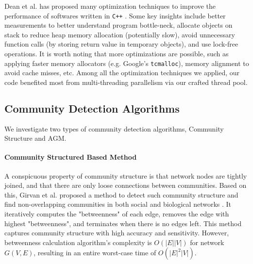 \par Dean et al. has proposed many optimization techniques 
to improve the performance of softwares written in \texttt{C++}
\citep{perfhint}. Some key insights include better measurements
to better understand program bottle-neck, allocate objects
on stack to reduce heap memory allocation (potentially slow), 
avoid unnecessary function calls (by storing return value in temporary
objects), and use lock-free operations. It is worth noting that 
more optimizations are possible, such as applying faster memory
allocators (e.g. Google's \texttt{tcmalloc}\citep{tcmalloc}),
memory alignment to avoid cache misses, etc. Among all the optimization
techniques we applied, our code benefited most from
multi-threading parallelism via our crafted thread pool.

\subsection{Community Detection Algorithms}
\label{sec:commdet}

\par We investigate two types of community detection algorithms,
Community Structure\citep{girvan2002community}  and AGM\citep{yang2012structure}.

\paragraph{Community Structured Based Method} A conspicuous property of 
community structure is that network nodes are tightly joined, and that
there are only loose connections between communities. Based on this,
Girvan et al. proposed a method to detect such community structure and
find non-overlapping communities in both social and biological networks
\citep{girvan2002community}. It iteratively computes the "betweenness"\citep{freeman1977graph}
of each edge, removes the edge with highest "betweenness", and terminates
when there is no edges left. This method captures community structure
with high accuracy and sensitivity. However, betweenness calculation algorithm's 
complexity  is $O(|E| |V|)$ for network $G(V,E)$, resulting in an
entire worst-case time of $O(|E|^2 |V|)$.


